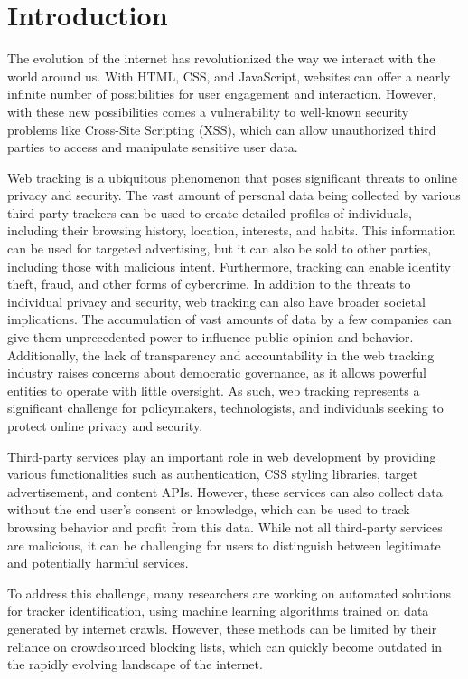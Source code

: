 \chapter{Introduction}
\label{cha:introduction}


The evolution of the internet has revolutionized the way we interact with the world around us.
With HTML, CSS, and JavaScript, websites can offer a nearly infinite number of possibilities for user
engagement and interaction. However, with these new possibilities comes a vulnerability to well-known
security problems like Cross-Site Scripting (XSS), which can allow unauthorized third parties to access
and manipulate sensitive user data.

Web tracking is a ubiquitous phenomenon that poses significant threats to online privacy and security.
The vast amount of personal data being collected by various third-party trackers can be used to create
detailed profiles of individuals, including their browsing history, location, interests, and habits.
This information can be used for targeted advertising, but it can also be sold to other parties,
including those with malicious intent. Furthermore, tracking can enable identity theft,
fraud, and other forms of cybercrime. In addition to the threats to individual privacy and security,
web tracking can also have broader societal implications. The accumulation of vast amounts of data by a
few companies can give them unprecedented power to influence public opinion and behavior.
Additionally, the lack of transparency and accountability in the web tracking industry raises
concerns about democratic governance, as it allows powerful entities to operate with
little oversight. As such, web tracking represents a significant challenge for policymakers,
technologists, and individuals seeking to protect online privacy and security.

Third-party services play an important role in web development by providing various functionalities
such as authentication, CSS styling libraries, target advertisement, and content APIs. 
However, these services can also collect data without the end user's consent or knowledge,
which can be used to track browsing behavior and profit from this data. 
While not all third-party services are malicious, it can be challenging for users to distinguish between
legitimate and potentially harmful services.

To address this challenge, many researchers are working on automated solutions 
for tracker identification, using machine learning algorithms trained on data generated
by internet crawls. However, these methods can be limited by their reliance
on crowdsourced blocking lists, which can quickly become outdated in
the rapidly evolving landscape of the internet.

